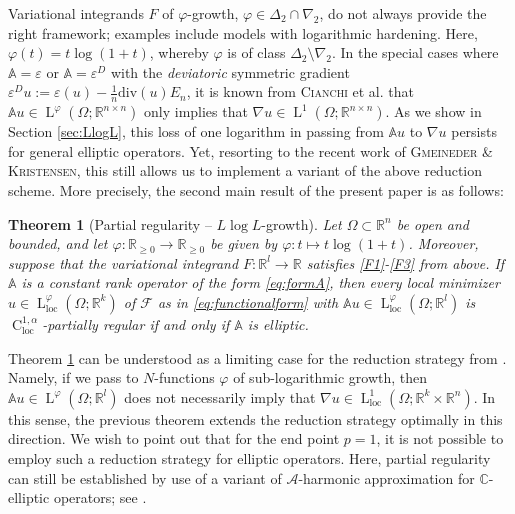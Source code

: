 \documentclass[a4paper,11pt]{amsart}
\numberwithin{equation}{section}
\newcommand{\R}{\mathbb{R}}
\newcommand{\locc}{\operatorname{loc}}
\newcommand{\lebe}{\operatorname{L}}
\newcommand{\hold}{\operatorname{C}}
\newtheorem{satz}[defi]{Theorem}
\begin{document}
	Variational integrands $F$ of $\varphi$-growth, $\varphi\in\Delta_{2}\cap\nabla_{2}$, do not always provide the right framework; examples include models with logarithmic hardening. Here, $\varphi(t)=t\log(1+t)$, whereby  $\varphi$ is of class $\Delta_{2}\setminus\nabla_{2}$. In the special cases where $\mathbb{A}=\varepsilon$ or $\mathbb{A}=\varepsilon^{D}$ with the \emph{deviatoric} symmetric gradient $\varepsilon^{D}u:=\varepsilon(u)-\frac{1}{n}\mathrm{div}(u)E_{n}$, it is known from \textsc{Cianchi} et al. \cite{cianchi_korn_2014,breit_trace-free_2017} that $\mathbb{A}u\in\lebe^{\varphi}(\Omega;\R^{n\times n})$ only implies that $\nabla u\in\lebe^{1}(\Omega;\R^{n\times n})$. As we show in Section \ref{sec:LlogL}, this loss of one logarithm in passing from $\mathbb{A}u$ to $\nabla u$ persists for general elliptic operators. Yet, resorting to the recent work \cite{gmeineder_quasiconvex_2024} of \textsc{Gmeineder \& Kristensen}, this still allows us to implement a variant of the above reduction scheme. More precisely, the second main result of the present paper is as follows: 
	\begin{satz}[Partial regularity -- $L \log L$-growth] \label{OrliczMainThm2}
		Let $\Omega \subset \R^n$ be open and bounded, and let $\varphi: \R_{\geq 0} \to \R_{\geq 0}$ be given by $\varphi\colon t \mapsto t \log(1+t)$. Moreover, suppose that the variational integrand $F:{\mathbb{R}^l} \to \mathbb{R}$ satisfies \ref{F1}-\ref{F3} from above. If $\mathbb{A}$ is a constant rank operator of the form \eqref{eq:formA}, then every local minimizer $u\in\lebe_{\locc}^{\varphi}(\Omega;{\mathbb{R}^k})$ of $\mathcal{F}$ as in \eqref{eq:functionalform} with $\mathbb{A}u\in\lebe_{\locc}^{\varphi}(\Omega;{\mathbb{R}^l})$ is $\hold_\text{loc}^{1, \alpha}$-partially regular if and only if $\mathbb{A}$ is elliptic. 
	\end{satz}
	Theorem \ref{OrliczMainThm2} can be understood as a limiting case for the reduction strategy from \cite{contiFXG}. Namely, if we pass to $N$-functions $\varphi$ of sub-logarithmic growth, then $\mathbb{A}u\in\lebe^{\varphi}(\Omega;{\mathbb{R}^l})$ does not necessarily imply that $\nabla u\in\lebe_{\locc}^{1}(\Omega; {\mathbb{R}^k}\times\R^{n})$. In this sense, the previous theorem extends the reduction strategy optimally in this direction. We wish to point out that for the end point $p=1$, it is not possible to employ such a reduction strategy for elliptic operators. Here, partial regularity can still be established by use of a variant of $\mathcal{A}$-harmonic approximation for $\mathbb{C}$-elliptic operators; see \cite{bärlin2022partialregularitymathbbaquasiconvexfunctionals}. 
	
\end{document}
